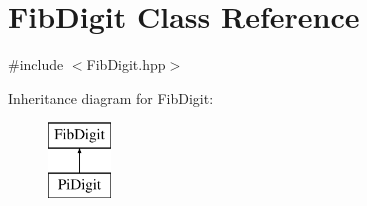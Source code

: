 \hypertarget{classFibDigit}{}\section{Fib\+Digit Class Reference}
\label{classFibDigit}


{\ttfamily \#include $<$Fib\+Digit.\+hpp$>$}

Inheritance diagram for Fib\+Digit\+:\begin{figure}[H]
\begin{center}
\leavevmode
\includegraphics[height=2.000000cm]{classFibDigit}
\end{center}
\end{figure}

